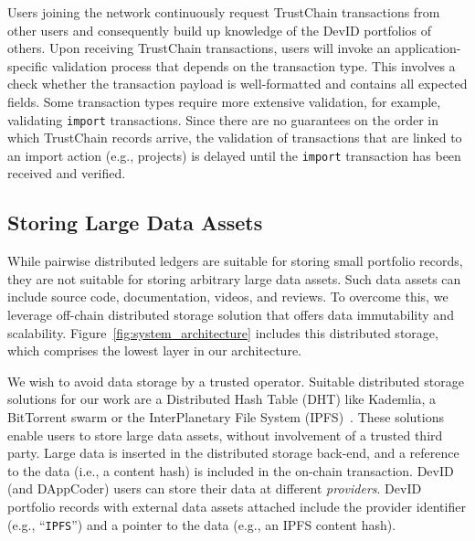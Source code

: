 Users joining the network continuously request TrustChain transactions from other users and consequently build up knowledge of the DevID portfolios of others.
Upon receiving TrustChain transactions, users will invoke an application-specific validation process that depends on the transaction type.
This involves a check whether the transaction payload is well-formatted and contains all expected fields.
Some transaction types require more extensive validation, for example, validating \texttt{import} transactions.
Since there are no guarantees on the order in which TrustChain records arrive, the validation of transactions that are linked to an import action (e.g., projects) is delayed until the \texttt{import} transaction has been received and verified.

\subsection{Storing Large Data Assets}
While pairwise distributed ledgers are suitable for storing small portfolio records, they are not suitable for storing arbitrary large data assets.
Such data assets can include source code, documentation, videos, and reviews.
To overcome this, we leverage off-chain distributed storage solution that offers data immutability and scalability.
Figure~\ref{fig:system_architecture} includes this distributed storage, which comprises the lowest layer in our architecture.

We wish to avoid data storage by a trusted operator.
Suitable distributed storage solutions for our work are a Distributed Hash Table (DHT) like Kademlia, a BitTorrent swarm or the InterPlanetary File System (IPFS)~\cite{maymounkov2002kademlia,cohen2008bittorrent,benet2014ipfs}.
These solutions enable users to store large data assets, without involvement of a trusted third party.
Large data is inserted in the distributed storage back-end, and a reference to the data (i.e., a content hash) is included in the on-chain transaction.
DevID (and DAppCoder) users can store their data at different \emph{providers}.
DevID portfolio records with external data assets attached include the provider identifier (e.g., \enquote{\texttt{IPFS}}) and a pointer to the data (e.g., an IPFS content hash).

